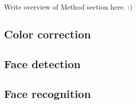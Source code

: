 Write overview of Method section here. :)

\subsection{Color correction}


\subsection{Face detection}


\subsection{Face recognition}

